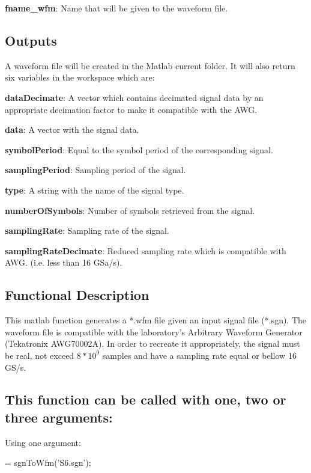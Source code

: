 \textbf{fname\_wfm}: Name that will be given to the waveform file.


\subsection*{Outputs}
A waveform file will be created in the Matlab current folder. It will also return six variables in the workspace which are:
\bigskip

\textbf{dataDecimate}: A vector which contains decimated signal data by an appropriate decimation factor to make it compatible with the AWG.
\bigskip	
	
\textbf{data}: A vector with the signal data.
\bigskip

\textbf{symbolPeriod}: Equal to the symbol period of the corresponding signal.
\bigskip

\textbf{samplingPeriod}: Sampling period of the signal.
\bigskip

\textbf{type}: A string with the name of the signal type.
\bigskip

\textbf{numberOfSymbols}: Number of symbols retrieved from the signal.
\bigskip

\textbf{samplingRate}: Sampling rate of the signal.
\bigskip

\textbf{samplingRateDecimate}: Reduced sampling rate which is compatible with AWG. (i.e. less than 16 GSa/s).
\bigskip


\subsection*{Functional Description}

This matlab function generates a *.wfm file given an input signal file (*.sgn). The waveform file is compatible with the laboratory's Arbitrary Waveform Generator (Tekatronix AWG70002A). In order to recreate it appropriately, the signal must be real, not exceed $8*10^9$ samples and have a sampling rate equal or bellow 16 GS/s.


\subsection*{This function can be called with one, two or three arguments:}
Using one argument:

\bigskip

 = sgnToWfm('S6.sgn');
\bigskip

